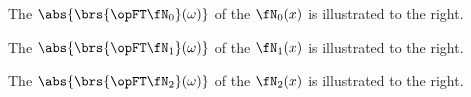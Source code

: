 \begin{minipage}{\tw-125mm}
\begin{example}
%
The  $\abs{\brs{\opFT\fN_0}(\omega)}$ of 
the  $\fN_0(x)$
is illustrated to the right.
\end{example}
\end{minipage}%
\hfill{}

\begin{minipage}{\tw-125mm}
\begin{example}
  The  $\abs{\brs{\opFT\fN_1}(\omega)}$ of the 
   $\fN_1(x)$
  is illustrated to the right.
\end{example}
\end{minipage}%
\hfill{}%

\begin{minipage}{\tw-125mm}
\begin{example}
  The  $\abs{\brs{\opFT\fN_2}(\omega)}$ of the 
   $\fN_2(x)$
  is illustrated to the right.
\end{example}
\end{minipage}%
\hfill{}%

